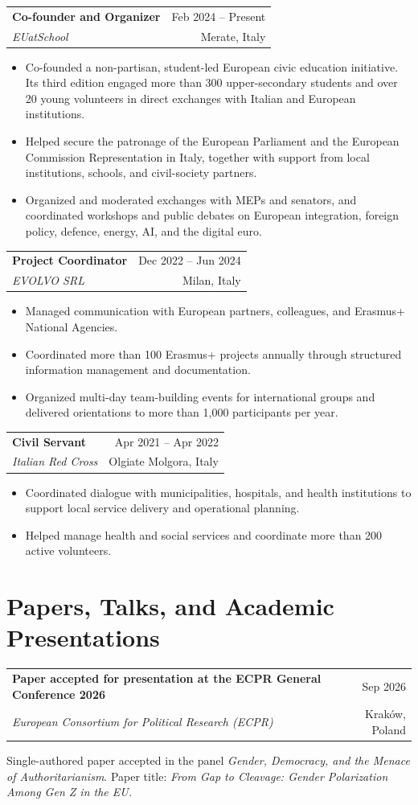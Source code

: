 \documentclass[11pt,a4paper]{article}
\makeatletter
\newcommand{\cventry}[4]{%
  \begin{tabularx}{\textwidth}{@{}Xr@{}}
    {\textbf{#1}} & {#4}\\
    {\emph{#2}} & {#3}
  \end{tabularx}\vspace{0.2em}
}
\makeatother
\begin{document}
\cventry{Co-founder and Organizer}{EUatSchool}{Merate, Italy}{Feb 2024 -- Present}
\begin{itemize}
  \item Co-founded a non-partisan, student-led European civic education initiative. Its third edition engaged more than 300 upper-secondary students and over 20 young volunteers in direct exchanges with Italian and European institutions.
  \item Helped secure the patronage of the European Parliament and the European Commission Representation in Italy, together with support from local institutions, schools, and civil-society partners.
  \item Organized and moderated exchanges with MEPs and senators, and coordinated workshops and public debates on European integration, foreign policy, defence, energy, AI, and the digital euro.
\end{itemize}

\cventry{Project Coordinator}{EVOLVO SRL}{Milan, Italy}{Dec 2022 -- Jun 2024}
\begin{itemize}
  \item Managed communication with European partners, colleagues, and Erasmus+ National Agencies.
  \item Coordinated more than 100 Erasmus+ projects annually through structured information management and documentation.
  \item Organized multi-day team-building events for international groups and delivered orientations to more than 1,000 participants per year.
\end{itemize}

\cventry{Civil Servant}{Italian Red Cross}{Olgiate Molgora, Italy}{Apr 2021 -- Apr 2022}
\begin{itemize}
  \item Coordinated dialogue with municipalities, hospitals, and health institutions to support local service delivery and operational planning.
  \item Helped manage health and social services and coordinate more than 200 active volunteers.
\end{itemize}

\section*{Papers, Talks, and Academic Presentations}

\cventry{Paper accepted for presentation at the ECPR General Conference 2026}{European Consortium for Political Research (ECPR)}{Krak\'ow, Poland}{Sep 2026}
Single-authored paper accepted in the panel \emph{Gender, Democracy, and the Menace of Authoritarianism}. Paper title: \emph{From Gap to Cleavage: Gender Polarization Among Gen Z in the EU.}
\end{document}
